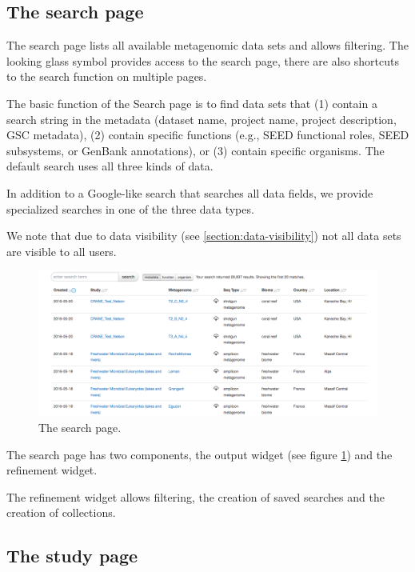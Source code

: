 \documentclass[12pt,fullpage]{report}
\begin{document}
\subsection{The search page}
\label{section:search-page}
The search page lists all available metagenomic data sets and allows filtering. The looking glass symbol provides access to the search page, there are also shortcuts to the search function on multiple pages.

The basic function of the Search page is to find data sets that (1) contain a search string in the metadata (dataset name, project name, project description, GSC metadata), (2) contain specific functions (e.g., SEED functional roles, SEED subsystems, or GenBank annotations), or (3) contain specific organisms. The default search uses all three kinds of data.

In addition to a Google-like search that searches all data fields, we provide specialized searches in one of the three data types.

We note that due to data visibility (see \ref{section:data-visibility}) not all data sets are visible to all users.

\begin{figure}[h]
\begin{center}
\includegraphics[width=7in]{Images/v4-search-page.png}
\end{center}
\caption{
The search page.
}
\label{fig:v4-search}
\end{figure}

The search page has two components, the output widget (see figure \ref{fig:v4-search}) and the refinement widget.

The refinement widget allows filtering, the creation of saved searches and the creation of collections.


\subsection{The study page}
\end{document}
